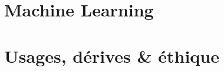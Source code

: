 \documentclass{report}
\begin{document}
    \section{Machine Learning}
    \section{Usages, dérives & éthique}




\newpage
\cite{Asimov:0}
\cite{Damasio:0}
\cite{Damasio:1}
\cite{Deleuze:0}
\cite{Deleuze:1}
\cite{Foucault:0}
\cite{Klein:0}
\cite{Marx:0}
\cite{Marx:1}
\cite{Moore:0}
\cite{Negri:0}
\cite{Nietzsche:0}
\cite{Pieces:0}
\cite{Rabhi:0}
\cite{MachineLearning:0}
\cite{MachineLearning:1}
\cite{ProgrammableCity:0}
\cite{ProgrammableCity:1}



\end{document}
